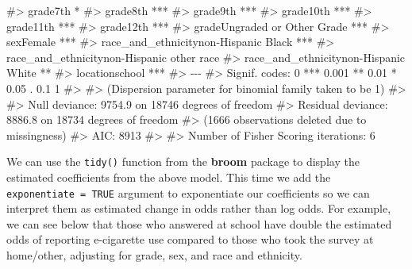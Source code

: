 \documentclass[
  letterpaper,
]{krantz}
\makeatletter
\newenvironment{Shaded}{\begin{snugshade}}{\end{snugshade}}
\newcommand{\CommentTok}[1]{\textcolor[rgb]{0.37,0.37,0.37}{#1}}
\newenvironment{kframe}{%
\medskip{}
\setlength{\fboxsep}{.8em}
 \def\at@end@of@kframe{}%
 \ifinner\ifhmode%
  \def\at@end@of@kframe{\end{minipage}}%
  \begin{minipage}{\columnwidth}%
 \fi\fi%
 \def\FrameCommand##1{\hskip\@totalleftmargin \hskip-\fboxsep
 \colorbox{shadecolor}{##1}\hskip-\fboxsep
     \hskip-\linewidth \hskip-\@totalleftmargin \hskip\columnwidth}%
 \MakeFramed {\advance\hsize-\width
   \@totalleftmargin\z@ \linewidth\hsize
   \@setminipage}}%
 {\par\unskip\endMakeFramed%
 \at@end@of@kframe}
\renewenvironment{Shaded}{\begin{kframe}}{\end{kframe}}
\makeatother
\begin{document}
\begin{Shaded}
\begin{Highlighting}[]
\CommentTok{\#\textgreater{} grade7th                                  *  }
\CommentTok{\#\textgreater{} grade8th                                  ***}
\CommentTok{\#\textgreater{} grade9th                                  ***}
\CommentTok{\#\textgreater{} grade10th                                 ***}
\CommentTok{\#\textgreater{} grade11th                                 ***}
\CommentTok{\#\textgreater{} grade12th                                 ***}
\CommentTok{\#\textgreater{} gradeUngraded or Other Grade              ***}
\CommentTok{\#\textgreater{} sexFemale                                 ***}
\CommentTok{\#\textgreater{} race\_and\_ethnicitynon{-}Hispanic Black      ***}
\CommentTok{\#\textgreater{} race\_and\_ethnicitynon{-}Hispanic other race    }
\CommentTok{\#\textgreater{} race\_and\_ethnicitynon{-}Hispanic White      ** }
\CommentTok{\#\textgreater{} locationschool                            ***}
\CommentTok{\#\textgreater{} {-}{-}{-}}
\CommentTok{\#\textgreater{} Signif. codes:  0 \textquotesingle{}***\textquotesingle{} 0.001 \textquotesingle{}**\textquotesingle{} 0.01 \textquotesingle{}*\textquotesingle{} 0.05 \textquotesingle{}.\textquotesingle{} 0.1 \textquotesingle{} \textquotesingle{} 1}
\CommentTok{\#\textgreater{} }
\CommentTok{\#\textgreater{} (Dispersion parameter for binomial family taken to be 1)}
\CommentTok{\#\textgreater{} }
\CommentTok{\#\textgreater{}     Null deviance: 9754.9  on 18746  degrees of freedom}
\CommentTok{\#\textgreater{} Residual deviance: 8886.8  on 18734  degrees of freedom}
\CommentTok{\#\textgreater{}   (1666 observations deleted due to missingness)}
\CommentTok{\#\textgreater{} AIC: 8913}
\CommentTok{\#\textgreater{} }
\CommentTok{\#\textgreater{} Number of Fisher Scoring iterations: 6}
\end{Highlighting}
\end{Shaded}

We can use the \texttt{tidy()} function from the \textbf{broom} package
to display the estimated coefficients from the above model. This time we
add the \texttt{exponentiate\ =\ TRUE} argument to exponentiate our
coefficients so we can interpret them as estimated change in odds rather
than log odds. For example, we can see below that those who answered at
school have double the estimated odds of reporting e-cigarette use
compared to those who took the survey at home/other, adjusting for
grade, sex, and race and ethnicity.
\end{document}
